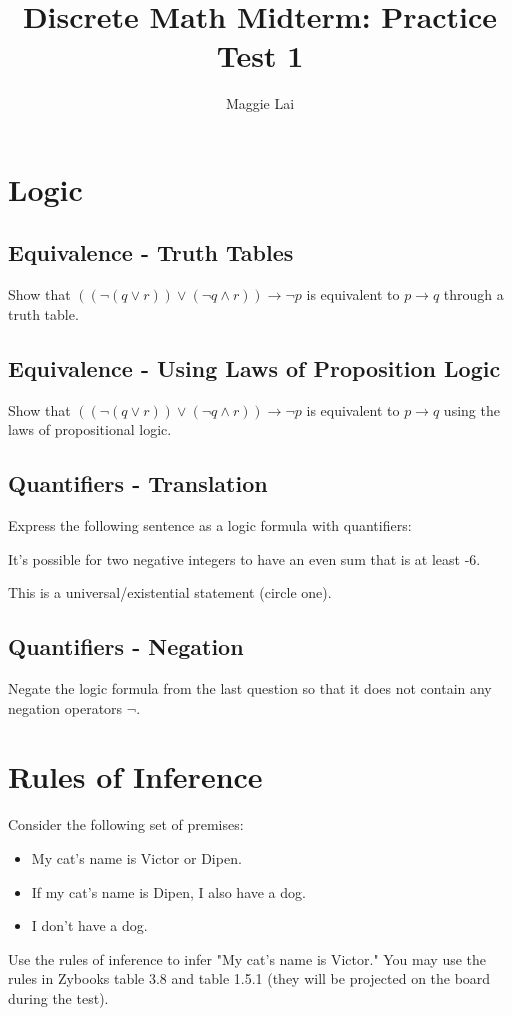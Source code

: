 \documentclass{article}
\title{Discrete Math Midterm: Practice Test 1}
\author{Maggie Lai}
\begin{document}
\maketitle



\section{Logic}

\subsection{Equivalence - Truth Tables}
Show that $((\neg (q\lor r)) \lor (\neg q \land r) ) \to \neg p$ is equivalent to $p\to q$ through a truth table.

\vspace*{3cm}

\subsection{Equivalence - Using Laws of Proposition Logic}
Show that $((\neg (q\lor r) ) \lor (\neg q \land r) ) \to \neg p$ is equivalent to $p\to q$ using the laws of propositional logic.

\vspace*{3cm}

\subsection{Quantifiers - Translation}
Express the following sentence as a logic formula with quantifiers:
\begin{center}
    It's possible for two negative integers to have an even sum that is at least -6.
\end{center}

\vspace*{1cm}

This is a universal/existential statement (circle one).

\subsection{Quantifiers - Negation}
Negate the logic formula from the last question so that it does not contain any negation operators $\neg$.

\vspace{1cm}

\section{Rules of Inference}
Consider the following set of premises:
\begin{itemize}
    \item My cat's name is Victor or Dipen.
    \item If my cat's name is Dipen, I also have a dog.
    \item I don't have a dog.
\end{itemize}
Use the rules of inference to infer "My cat's name is Victor." You may use the rules in Zybooks table 3.8 and table 1.5.1 (they will be projected on the board during the test).
\end{document}
